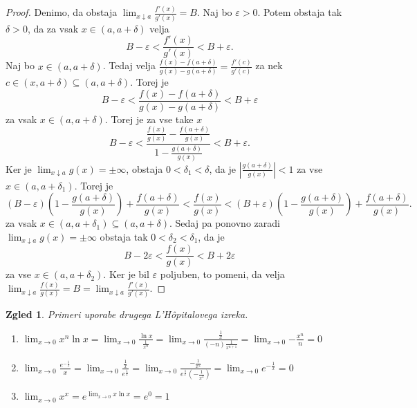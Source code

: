 \documentclass[10pt, a4paper]{article}
\newtheorem{zgled}{Zgled}[section]
\newenvironment{noticeC}{%
  \tcolorbox[%
  notitle,
  empty,
  enhanced,  %
  breakable,
  coltext=black, 
  fontupper=\rmfamily,
  parbox=false,
  noparskip,
  sharp corners,
  boxrule=-1pt,  %
  frame hidden,
  left=7pt,  %
  right=7pt,
  top=5pt,
  bottom=5pt,
  before skip=2.5ex plus 2pt,
  after skip=2.5ex plus 2pt,
  overlay unbroken and last={%
  },
  ]}
{\endtcolorbox}
\newenvironment{dokaz}%
  {\begin{noticeC}\begin{proof}}%
  {\end{proof}\end{noticeC}}
\newcommand{\limf}[3]{\lim_{#1 \to #2} {#3}}
\newcommand{\rlimf}[3]{\lim_{#1 \downarrow #2} {#3}}
\begin{document}
\begin{dokaz}
    Denimo, da obstaja $\rlimf{x}{a}{\frac{f'(x)}{g'(x)}} = B.$
    Naj bo $\varepsilon > 0$.
    Potem obstaja tak $\delta > 0$, da za vsak $x \in (a, a + \delta)$ velja
    $$B - \varepsilon < \frac{f'(x)}{g'(x)} < B + \varepsilon.$$
    Naj bo $x \in (a, a + \delta)$.
    Tedaj velja
    $\frac{f(x) - f(a + \delta)}{g(x) - g(a + \delta)} = \frac{f'(c)}{g'(c)}$
    za nek $c \in (x, a + \delta) \subseteq (a, a + \delta)$.
    Torej je 
    $$B - \varepsilon < \frac{f(x) - f(a + \delta)}{g(x) - g(a + \delta)} < B + \varepsilon$$
    za vsak $x \in (a, a + \delta).$
    Torej je za vse take $x$
    $$B - \varepsilon < \frac{\frac{f(x)}{g(x)} - \frac{f(a + \delta)}{g(x)}}{1 - \frac{g(a + \delta)}{g(x)}} < B + \varepsilon.$$
    Ker je $\rlimf{x}{a}{g(x)} = \pm \infty$, obstaja $0 < \delta_1 < \delta$, da je
    $\left| \frac{g(a + \delta)}{g(x)} \right| < 1$
    za vse $x \in (a, a + \delta_1)$.
    Torej je
    $$(B - \varepsilon)\left(1 - \frac{g(a + \delta)}{g(x)}\right) + \frac{f(a + \delta)}{g(x)} < \frac{f(x)}{g(x)} < (B + \varepsilon)\left(1 - \frac{g(a + \delta)}{g(x)}\right) + \frac{f(a + \delta)}{g(x)}.$$
    za vsak $x \in (a, a + \delta_1) \subseteq (a, a + \delta)$.
    Sedaj pa ponovno zaradi $\rlimf{x}{a}{g(x)} = \pm \infty$ obstaja tak $0 < \delta_2 < \delta_1$, da je
    $$B - 2 \varepsilon < \frac{f(x)}{g(x)} < B + 2 \varepsilon$$
    za vse $x \in (a, a + \delta_2)$.
    Ker je bil $\varepsilon$ poljuben, to pomeni, da velja
    $
        \rlimf{x}{a}{\frac{f(x)}{g(x)}} = B = \rlimf{x}{a}{\frac{f'(x)}{g'(x)}}
    $.
\end{dokaz}

\begin{zgled}
    Primeri uporabe drugega L'Hôpitalovega izreka.
    \begin{enumerate}
        \item $\displaystyle \limf{x}{0}{x^n \ln x} = \limf{x}{0}{\frac{\ln x}{\frac{1}{x^n}}} = \limf{x}{0}{\frac{\frac{1}{x}}{(-n) \frac{1}{x^{n+1}}}} = \limf{x}{0}{-\frac{x^n}{n}} = 0$
        \item $\displaystyle \limf{x}{0}{\frac{e^{-\frac{1}{x}}}{x}} = \limf{x}{0}{\frac{\frac{1}{x}}{e^{\frac{1}{x}}}} = \limf{x}{0}{\frac{-\frac{1}{x^2}}{e^{\frac{1}{x}} (-\frac{1}{x^2})}} = \limf{x}{0}{e^{-\frac{1}{x}}} = 0$
        \item $\displaystyle \limf{x}{0}{x^x} = e^{\limf{x}{0}{x \ln x}} = e^0 = 1$
    \end{enumerate}
\end{zgled}
\end{document}

